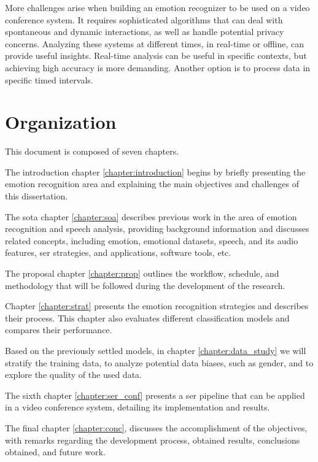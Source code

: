 More challenges arise when building an emotion recognizer to be used on a video conference system. It requires sophisticated algorithms that can deal with spontaneous and dynamic interactions, as well as handle potential privacy concerns. Analyzing these systems at different times, in real-time or offline, can provide useful insights. Real-time analysis can be useful in specific contexts, but achieving high accuracy is more demanding. Another option is to process data in specific timed intervals.

\section{Organization}

This document is composed of seven chapters.

The introduction chapter \ref{chapter:introduction} begins by briefly presenting the emotion recognition area and explaining the main objectives and challenges of this dissertation.

The \ac{sota} chapter \ref{chapter:soa} describes previous work in the area of emotion recognition and speech analysis, providing background information and discusses related concepts, including emotion, emotional datasets, speech, and its audio features, \ac{ser} strategies, and applications, software tools, etc.

The proposal chapter \ref{chapter:prop} outlines the workflow, schedule, and methodology that will be followed during the development of the research.

Chapter \ref{chapter:strat} presents the emotion recognition strategies and describes their process. This chapter also evaluates different classification models and compares their performance.

Based on the previously settled models, in chapter \ref{chapter:data_study} we will stratify the training data, to analyze potential data biases, such as gender, and to explore the quality of the used data.

The sixth chapter \ref{chapter:ser_conf} presents a \ac{ser} pipeline that can be applied in a video conference system, detailing its implementation and results.

The final chapter \ref{chapter:conc}, discusses the accomplishment of the objectives, with remarks regarding the development process, obtained results, conclusions obtained, and future work.